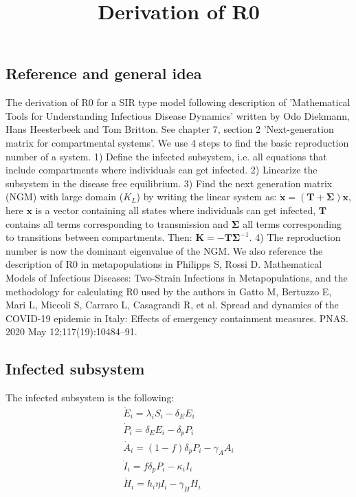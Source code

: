 \documentclass{article}
\title{Derivation of R0}
\newcommand{\bs}[1]{\boldsymbol{#1}}
\begin{document}
\maketitle

\subsection*{Reference and general idea}

The derivation of R0 for a SIR type model following description of 'Mathematical Tools for Understanding Infectious Disease Dynamics' written by Odo Diekmann, Hans Heesterbeek and Tom Britton. 
See chapter 7, section 2 'Next-generation matrix for compartmental systems'. 
We use 4 steps to find the basic reproduction number of a system.
1) Define the infected subsystem, i.e. all equations that include compartments where individuals can get infected. 
2) Linearize the subsystem in the disease free equilibrium. 
3) Find the next generation matrix (NGM) with large domain ($K_L$) by writing the linear system as: $\bs{\dot{x}} = (\bs{T} + \bs{\Sigma}) \bs{x}$, here $\bs{x}$ is a vector containing all states where individuals can get infected, $\bs{T}$ contains all terms corresponding to transmission and $\bs{\Sigma}$ all terms corresponding to transitions between compartments. Then: $\bs{K} = -\bs{T} \bs{\Sigma}^{-1}. $
4) The reproduction number is now the dominant eigenvalue of the NGM. 
We also reference the description of R0 in metapopulations in Philipps S, Rossi D. Mathematical Models of Infectious Diseases: Two-Strain Infections in Metapopulations, and the methodology for calculating R0 used by the authors in Gatto M, Bertuzzo E, Mari L, Miccoli S, Carraro L, Casagrandi R, et al. Spread and dynamics of the COVID-19 epidemic in Italy: Effects of emergency containment measures. PNAS. 2020 May 12;117(19):10484–91.


\subsection*{Infected subsystem}

The infected subsystem is the following: 
\\
\begin{gather}
    \dot{E}_i =  \lambda_i S_i - \delta_E E_i \\
    \dot{P}_i = \delta_E E_i - \delta_p P_i \\
    \dot{A}_i = (1-f) \delta_p P_i - \gamma_A A_i \\
    \dot{I}_i = f \delta_p P_i - \kappa_i I_i \\   
    \dot{H}_i = h_i \eta I_i - \gamma_H H_i   
\end{gather}
\\
\end{document}
